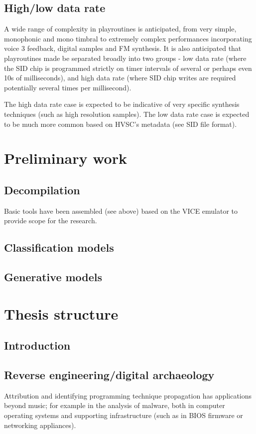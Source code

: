 \documentclass[10pt]{article}
\begin{document}
\begin{multicols*}{2}
  \subsection{High/low data rate}
  A wide range of complexity in playroutines is anticipated, from
  very simple, monophonic and mono timbral to extremely
  complex performances incorporating voice 3 feedback, digital
  samples and FM synthesis. It is also anticipated that playroutines
  made be separated broadly into two groups - low data rate (where
  the SID chip is programmed strictly on timer intervals of
  several or perhaps even 10s of milliseconds), and high data rate
  (where SID chip writes are required potentially several times
  per millisecond).

  The high data rate case is expected to be indicative of very
  specific synthesis techniques (such as high resolution samples).
  The low data rate case is expected to be much more common based
  on HVSC's metadata (see SID file format).

  \section{Preliminary work}

  \subsection{Decompilation}
  Basic tools have been assembled (see above) based on the VICE
  emulator to provide scope for the research. 

  \subsection{Classification models}

  \subsection{Generative models}

  \section{Thesis structure}

  \subsection{Introduction}

  \subsection{Reverse engineering/digital archaeology}
  Attribution and identifying programming technique propagation
  has applications beyond music; for example in the analysis
  of malware, both in computer operating systems and
  supporting infrastructure (such as in BIOS firmware
  or networking appliances).


\end{multicols*}
\end{document}
